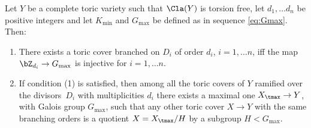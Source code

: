\documentclass[10pt]{amsart}
\numberwithin{equation}{section}
\begin{document}
\begin{theorem} \label{thm:Tmax}
Let $Y$ be a complete  toric variety such that $\Cla(Y)$ is torsion free, let $d_1,\dots d_n$ be positive integers and 
let $K_{\min}$ and $G_{\max}$ be defined as in sequence \eqref{eq:Gmax}. Then:
\begin{enumerate}
\item There exists a toric cover branched on $D_i$ of order $d_i$, $i=1,\dots n$,  iff the map $\bZ_{d_i}\to G_{\max}$ is injective for $i=1,\dots n$. 
\item If condition (1) is satisfied, then among all the  toric covers of $Y$ ramified over the
  divisors~$D_i$  with multiplicities $d_i$ there exists a maximal
  one $X_{\tmax}\to Y$, with Galois group $G_{\max}$,  such that 
  any other  toric cover $X\to Y$ with the same
  branching  orders is a quotient $X=X_{\tmax}/H$ by a
  subgroup $H< G_{\max}$.
  \end{enumerate}
\end{theorem}
\end{document}
